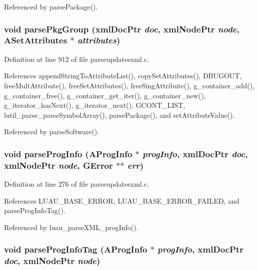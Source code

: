 Referenced by parse\-Package().
\subsubsection{\setlength{\rightskip}{0pt plus 5cm}void parse\-Pkg\-Group (xml\-Doc\-Ptr {\em doc}, xml\-Node\-Ptr {\em node}, {\bf ASet\-Attributes} $\ast$ {\em attributes})\hspace{0.3cm}{\tt  [static]}}\label{parseupdatesxml_8c_a16}




Definition at line 912 of file parseupdatesxml.c.

References append\-String\-To\-Attribute\-List(), copy\-Set\-Attributes(), DBUGOUT, free\-Mult\-Attribute(), free\-Set\-Attributes(), free\-Sing\-Attribute(), g\_\-container\_\-add(), g\_\-container\_\-free(), g\_\-container\_\-get\_\-iter(), g\_\-container\_\-new(), g\_\-iterator\_\-has\-Next(), g\_\-iterator\_\-next(), GCONT\_\-LIST, lutil\_\-parse\_\-parse\-Symbol\-Array(), parse\-Package(), and set\-Attribute\-Value().

Referenced by parse\-Software().
\subsubsection{\setlength{\rightskip}{0pt plus 5cm}void parse\-Prog\-Info ({\bf AProg\-Info} $\ast$ {\em prog\-Info}, xml\-Doc\-Ptr {\em doc}, xml\-Node\-Ptr {\em node}, GError $\ast$$\ast$ {\em err})\hspace{0.3cm}{\tt  [static]}}\label{parseupdatesxml_8c_a5}




Definition at line 276 of file parseupdatesxml.c.

References LUAU\_\-BASE\_\-ERROR, LUAU\_\-BASE\_\-ERROR\_\-FAILED, and parse\-Prog\-Info\-Tag().

Referenced by luau\_\-parse\-XML\_\-prog\-Info().
\subsubsection{\setlength{\rightskip}{0pt plus 5cm}void parse\-Prog\-Info\-Tag ({\bf AProg\-Info} $\ast$ {\em prog\-Info}, xml\-Doc\-Ptr {\em doc}, xml\-Node\-Ptr {\em node})\hspace{0.3cm}{\tt  [static]}}\label{parseupdatesxml_8c_a6}





